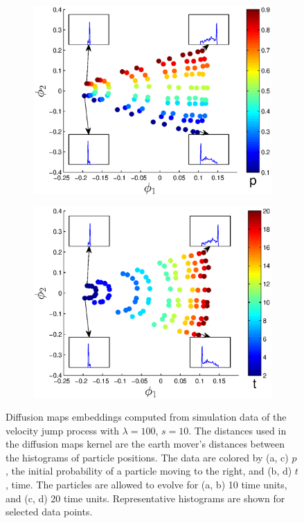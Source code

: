 \documentclass[prl, reprint, final, showkeys]{revtex4-1}
\begin{document}
\begin{figure}[t]
\begin{subfigure}{0.45\columnwidth}
\includegraphics[width=\textwidth]{EMD2_withhist_p_20}
\caption{}
\end{subfigure}
\begin{subfigure}{0.45\columnwidth}
\includegraphics[width=\textwidth]{EMD2_withhist_t_20}
\caption{}
\end{subfigure}
\caption{Diffusion maps embeddings computed from simulation data of the velocity jump process with $\lambda=100$, $s=10$. The distances used in the diffusion maps kernel are the earth mover's distances between the histograms of particle positions. The data are colored by (a, c) $p$, the initial probability of a particle moving to the right, and (b, d) $t$, time. The particles are allowed to evolve for (a, b) 10 time units, and (c, d) 20 time units.  Representative histograms are shown for selected data points.} 
\label{fig:dmaps_embed_varyt}
\end{figure}
\end{document}
